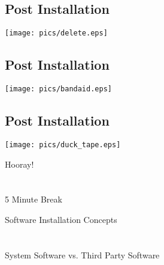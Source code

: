 \documentclass[xga]{xdvislides}
\begin{document}
\subsection{Post Installation}
\vspace*{\fill}
\begin{center}
	\texttt{[image: pics/delete.eps]}
\end{center}
\vspace*{\fill}

\subsection{Post Installation}
\vspace*{\fill}
\begin{center}
	\texttt{[image: pics/bandaid.eps]}
\end{center}
\vspace*{\fill}

\subsection{Post Installation}
\vspace*{\fill}
\begin{center}
	\texttt{[image: pics/duck\_tape.eps]}
\end{center}
\vspace*{\fill}

\newpage
\vspace*{\fill}
\begin{center}
    \Hugesize
        Hooray! \\ [1em]
    \hspace*{5mm}
    \blueline\\
    \hspace*{5mm}\\
        5 Minute Break
\end{center}
\vspace*{\fill}

\newpage
\vspace*{\fill}
\begin{center}
	\Hugesize
		Software Installation Concepts \\ [1em]
	\hspace*{5mm}
	\blueline\\
	\hspace*{5mm}\\
		System Software vs. Third Party Software
\end{center}
\vspace*{\fill}
\end{document}

